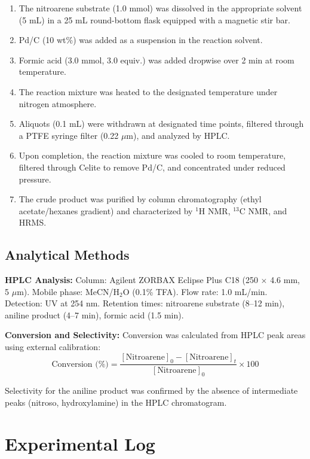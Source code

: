 \documentclass[
    language=english,
    doctype=experiment-log,
    institution=none,
]{../../omnilatex}
\begin{document}
\begin{enumerate}
    \item The nitroarene substrate (1.0 mmol) was dissolved in the appropriate
          solvent (5 mL) in a 25 mL round-bottom flask equipped with a
          magnetic stir bar.
    \item Pd/C (10 wt\%) was added as a suspension in the reaction solvent.
    \item Formic acid (3.0 mmol, 3.0 equiv.) was added dropwise over 2 min
          at room temperature.
    \item The reaction mixture was heated to the designated temperature under
          nitrogen atmosphere.
    \item Aliquots (0.1 mL) were withdrawn at designated time points,
          filtered through a PTFE syringe filter (0.22 $\mu$m), and analyzed
          by HPLC.
    \item Upon completion, the reaction mixture was cooled to room temperature,
          filtered through Celite to remove Pd/C, and concentrated under
          reduced pressure.
    \item The crude product was purified by column chromatography (ethyl
          acetate/hexanes gradient) and characterized by $^1$H NMR, $^{13}$C
          NMR, and HRMS.
\end{enumerate}

\subsection{Analytical Methods}

\textbf{HPLC Analysis:} Column: Agilent ZORBAX Eclipse Plus C18 (250 $\times$
4.6 mm, 5 $\mu$m). Mobile phase: MeCN/H$_2$O (0.1\% TFA). Flow rate:
1.0 mL/min. Detection: UV at 254 nm. Retention times: nitroarene substrate
(8--12 min), aniline product (4--7 min), formic acid (1.5 min).

\textbf{Conversion and Selectivity:} Conversion was calculated from HPLC peak
areas using external calibration:
\begin{equation}
    \text{Conversion (\%)} = \frac{[\text{Nitroarene}]_0 - [\text{Nitroarene}]_t}{[\text{Nitroarene}]_0} \times 100
    \label{eq:conversion}
\end{equation}

Selectivity for the aniline product was confirmed by the absence of
intermediate peaks (nitroso, hydroxylamine) in the HPLC chromatogram.

\section{Experimental Log}
\label{sec:log}
\end{document}
